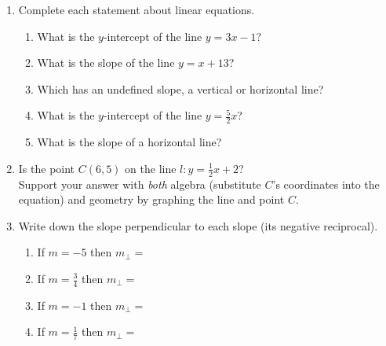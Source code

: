 \begin{enumerate}
\item Complete each statement about linear equations.
\begin{enumerate}[itemsep=0.5cm]
  \item What is the $y$-intercept of the line $y = 3x - 1$?
  \item What is the slope of the line $y = x + 13$?
  \item Which has an undefined slope, a vertical or horizontal line?
  \item What is the $y$-intercept of the line $y = \frac{5}{2}x$?
  \item What is the slope of a horizontal line?
\end{enumerate}

\item Is the point $C(6,5)$ on the line $l: y=\frac{1}{2}x+2$? \\[0.5cm]
Support your answer with \emph{both} algebra (substitute $C$'s coordinates into the equation) and geometry by graphing the line and point $C$.
  \begin{flushright}
  \end{flushright}

\item Write down the slope perpendicular to each slope (its negative reciprocal).
  \begin{enumerate}[itemsep=0.9cm]
    \item If $m = -5$ then $m_{\perp}=$
    \item If $\displaystyle m = \frac{3}{4}$ then $m_{\perp}=$
    \item If $m = -1$ then $m_{\perp}=$
    \item If $\displaystyle m = \frac{1}{7}$ then $m_{\perp}=$
  \end{enumerate}
  

\end{enumerate}
